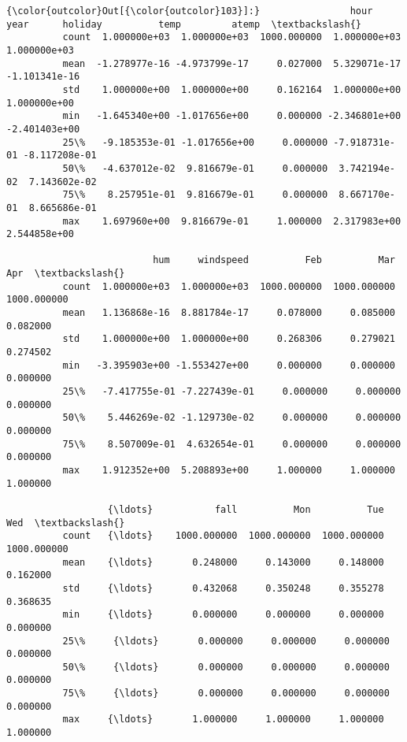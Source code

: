 \documentclass[11pt]{article}
\begin{document}
\begin{Verbatim}[commandchars=\\\{\}]
{\color{outcolor}Out[{\color{outcolor}103}]:}                hour          year      holiday          temp         atemp  \textbackslash{}
          count  1.000000e+03  1.000000e+03  1000.000000  1.000000e+03  1.000000e+03   
          mean  -1.278977e-16 -4.973799e-17     0.027000  5.329071e-17 -1.101341e-16   
          std    1.000000e+00  1.000000e+00     0.162164  1.000000e+00  1.000000e+00   
          min   -1.645340e+00 -1.017656e+00     0.000000 -2.346801e+00 -2.401403e+00   
          25\%   -9.185353e-01 -1.017656e+00     0.000000 -7.918731e-01 -8.117208e-01   
          50\%   -4.637012e-02  9.816679e-01     0.000000  3.742194e-02  7.143602e-02   
          75\%    8.257951e-01  9.816679e-01     0.000000  8.667170e-01  8.665686e-01   
          max    1.697960e+00  9.816679e-01     1.000000  2.317983e+00  2.544858e+00   
          
                          hum     windspeed          Feb          Mar          Apr  \textbackslash{}
          count  1.000000e+03  1.000000e+03  1000.000000  1000.000000  1000.000000   
          mean   1.136868e-16  8.881784e-17     0.078000     0.085000     0.082000   
          std    1.000000e+00  1.000000e+00     0.268306     0.279021     0.274502   
          min   -3.395903e+00 -1.553427e+00     0.000000     0.000000     0.000000   
          25\%   -7.417755e-01 -7.227439e-01     0.000000     0.000000     0.000000   
          50\%    5.446269e-02 -1.129730e-02     0.000000     0.000000     0.000000   
          75\%    8.507009e-01  4.632654e-01     0.000000     0.000000     0.000000   
          max    1.912352e+00  5.208893e+00     1.000000     1.000000     1.000000   
          
                  {\ldots}           fall          Mon          Tue          Wed  \textbackslash{}
          count   {\ldots}    1000.000000  1000.000000  1000.000000  1000.000000   
          mean    {\ldots}       0.248000     0.143000     0.148000     0.162000   
          std     {\ldots}       0.432068     0.350248     0.355278     0.368635   
          min     {\ldots}       0.000000     0.000000     0.000000     0.000000   
          25\%     {\ldots}       0.000000     0.000000     0.000000     0.000000   
          50\%     {\ldots}       0.000000     0.000000     0.000000     0.000000   
          75\%     {\ldots}       0.000000     0.000000     0.000000     0.000000   
          max     {\ldots}       1.000000     1.000000     1.000000     1.000000   
          

\end{Verbatim}
\end{document}

